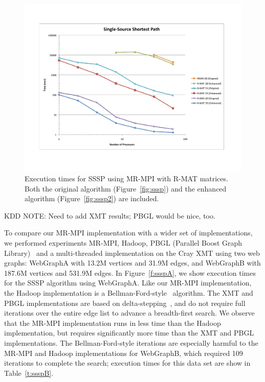 \begin{figure}[h!]
\includegraphics[width=\textwidth]{fig_sssp.pdf}
\caption{Execution times for SSSP using MR-MPI with R-MAT matrices.  
Both the original algorithm (Figure~\ref{fig:sssp}) and the enhanced 
algorithm (Figure~\ref{fig:sssp2}) are included.}
\label{f:sssp}
\end{figure}

KDD NOTE:  Need to add XMT results; PBGL would be nice, too.

To compare our MR-MPI implementation with a wider set of implementations,
we performed experiments MR-MPI, Hadoop, PBGL (Parallel
Boost Graph Library)~\cite{PBGL} and a multi-threaded implementation on the
Cray XMT using two web graphs: {WebGraphA} with 13.2M
vertices and 31.9M edges, and {WebGraphB} with 187.6M vertices and 531.9M edges.
In Figure~\ref{f:ssspA}, we show execution times for the SSSP algorithm
using {WebGraphA}.   Like our MR-MPI implementation, the Hadoop 
implementation is a Bellman-Ford-style~\cite{Bellman58,Ford62}  algorithm.  
The XMT and PBGL implementations are based on 
delta-stepping~\cite{MeyerSanders98}, and do not require full iterations
over the entire edge list to advance a breadth-first search.  
We observe that the MR-MPI
implementation runs in less time than the Hadoop implementation, but requires
significantly more time than the XMT and PBGL implementations.  
The Bellman-Ford-style iterations are especially harmful to the MR-MPI and
Hadoop implementations for {WebGraphB}, which required 109 iterations to 
complete the search; 
execution times for this data set are show in Table~\ref{t:ssspB}.

